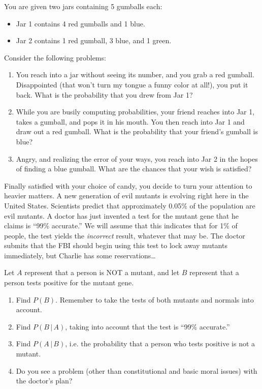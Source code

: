 

You are given two jars containing 5 gumballs each:
	\begin{itemize}
	\item Jar 1 contains 4 red gumballs and 1 blue.
	\item Jar 2 contains 1 red gumball, 3 blue, and 1 green.
	\end{itemize}
	
	
Consider the following problems:
	\begin{enumerate}[1.]
	\item You reach into a jar without seeing its number, and you grab a red gumball. Disappointed (that won't turn my tongue a funny color at all!), you put it back. What is the probability that you drew from Jar 1?
	\item While you are busily computing probabilities, your friend reaches into Jar 1, takes a gumball, and pops it in his mouth. You then reach into Jar 1 and draw out a red gumball. What is the probability that your friend's gumball is blue?
	\item Angry, and realizing the error of your ways, you reach into Jar 2 in the hopes of finding a blue gumball. What are the chances that your wish is satisfied?
	\end{enumerate}


Finally satisfied with your choice of candy, you decide to turn your attention to heavier matters. A new generation of evil mutants is evolving right here in the United States. Scientists predict that approximately 0.05\% of the population are evil mutants. A doctor has just invented a test for the mutant gene that he claims is ``99\% accurate.'' We will assume that this indicates that for 1\% of people, the test yields the \emph{incorrect} result, whatever that may be. The doctor submits that the FBI should begin using this test to lock away mutants immediately, but Charlie has some reservations\dots




Let $A$ represent that a person is NOT a mutant, and let $B$ represent that a person tests positive for the mutant gene.
	\begin{enumerate}[1.]
	\item Find $P(B)$. Remember to take the tests of both mutants and normals into account.
	\item Find $P(B\,|\,A)$, taking into account that the test is ``99\% accurate.''
	\item Find $P(A\,|\,B)$, i.e. the probability that a person who tests positive is not a mutant.
	\item Do you see a problem (other than constitutional and basic moral issues) with the doctor's plan?
	\end{enumerate}